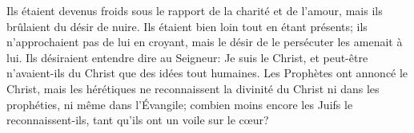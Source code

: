 Ils étaient devenus froids sous le rapport de la charité et de l’amour,
	mais ils brûlaient du désir de nuire.
Ils étaient bien loin tout en étant présents;
	ils n’approchaient pas de lui en croyant,
	mais le désir de le persécuter les amenait à lui.
Ils désiraient entendre dire au Seigneur: Je suis le Christ,
	et peut-être n’avaient-ils du Christ que des idées tout humaines.
Les Prophètes ont annoncé le Christ,
	mais les hérétiques ne reconnaissent la divinité du Christ
	ni dans les prophéties, ni même dans l’Évangile;
	combien moins encore les Juifs le reconnaissent-ils,
	tant qu’ils ont un voile sur le cœur?
